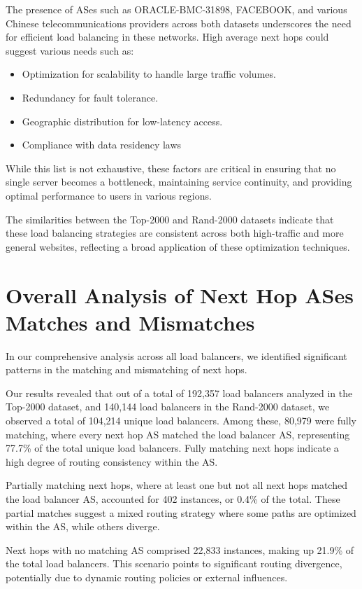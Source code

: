 \documentclass[12pt]{cwru_thesis}
\begin{document}
The presence of ASes such as ORACLE-BMC-31898, FACEBOOK, and various Chinese telecommunications providers across both datasets underscores the need for efficient load balancing in these networks. High average next hops could suggest various needs such as:
\begin{itemize}
    \item Optimization for scalability to handle large traffic volumes.
    \item Redundancy for fault tolerance.
    \item Geographic distribution for low-latency access.
    \item Compliance with data residency laws
\end{itemize} 

While this list is not exhaustive, these factors are critical in ensuring that no single server becomes a bottleneck, maintaining service continuity, and providing optimal performance to users in various regions. 


The similarities between the Top-2000 and Rand-2000 datasets indicate that these load balancing strategies are consistent across both high-traffic and more general websites, reflecting a broad application of these optimization techniques.


\section{Overall Analysis of Next Hop ASes Matches and Mismatches}

In our comprehensive analysis across all load balancers, we identified significant patterns in the matching and mismatching of next hops.

Our results revealed that out of a total of 192,357 load balancers analyzed in the Top-2000 dataset, and 140,144 load balancers in the Rand-2000 dataset, we observed a total of 104,214 unique load balancers. Among these, 80,979 were fully matching, where every next hop AS matched the load balancer AS, representing 77.7\% of the total unique load balancers. Fully matching next hops indicate a high degree of routing consistency within the AS.

Partially matching next hops, where at least one but not all next hops matched the load balancer AS, accounted for 402 instances, or 0.4\% of the total. These partial matches suggest a mixed routing strategy where some paths are optimized within the AS, while others diverge.

Next hops with no matching AS comprised 22,833 instances, making up 21.9\% of the total load balancers. This scenario points to significant routing divergence, potentially due to dynamic routing policies or external influences.
\end{document}
